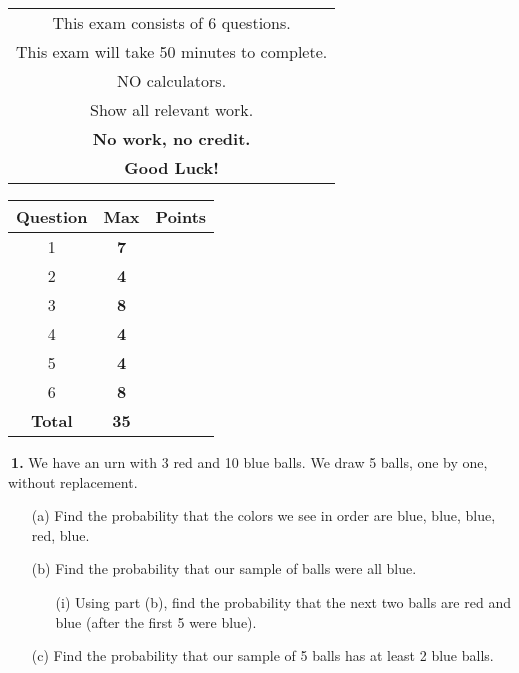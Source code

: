 \documentclass[12pt]{report}
\begin{document}
\begin{minipage}[b]{80mm}
\begin{tabular}{c}
\noindent This exam consists of 6 questions. \\

\noindent This exam will take 50 minutes to complete. \\

\noindent NO calculators.\\

\noindent Show all relevant work.\\
\noindent \textbf{No work, no credit.}\\

\noindent \textbf{Good Luck!}\\
\end{tabular}
\end{minipage}
\begin{minipage}[b]{80mm}
\begin{tabular}{ |c|c|c| }
	\hline
	\textbf{Question} & \textbf{Max} & \textbf{Points} \\
	\hline
	\hline
	1& \textbf{7} & \\
	\hline
	2& \textbf{4} & \\
	\hline
	3& \textbf{8} & \\
	\hline
	4& \textbf{4} & \\
	\hline
	5& \textbf{4} & \\
	\hline
	6& \textbf{8} & \\
	\hline
	\hline
	\textbf{Total} & \textbf{35} & \\
	\hline
\end{tabular}
\end{minipage}

\pagebreak








\noindent {} $~$\textbf{1.} We have an urn with 3 red and 10 blue balls. We draw 5 balls, one by one, without replacement. 
\begin{itemize}
\item [(a)] Find the probability that the colors we see in order are blue, blue, blue, red, blue.		%
\item [(b)] Find the probability that our sample of balls were all blue.					%
	\begin{itemize}
	\item [(i)] Using part (b), find the probability that the next two balls are red and blue (after the first 5 were blue).   %
	\end{itemize}
\item [(c)]  Find the probability that our sample of 5 balls has at least 2 blue balls. 		%
\end{itemize}
\pagebreak
\end{document}
